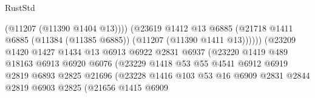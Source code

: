 \begin{lexlean}{RustStd}
\begin{coremodule}
                                              (@11207 (@11390 @1404 @13))))
                                          (@23619
                                            @1412
                                            @13
                                            @6885
                                            (@21718
                                              @1411
                                              @6885
                                              (@11384 (@11385 @6885))
                                              (@11207 (@11390 @1411 @13))))))
                                      (@23209
                                        @1420
                                        @1427
                                        @1434
                                        @13
                                        @6913
                                        @6922
                                        @2831
                                        @6937
                                        (@23220
                                          @1419
                                          @489
                                          @18163
                                          @6913
                                          @6920
                                          @6076
                                          (@23229
                                            @1418
                                            @53
                                            @55
                                            @4541
                                            @6912
                                            @6919
                                            @2819
                                            @6893
                                            @2825
                                            @21696
                                            (@23228
                                              @1416
                                              @103
                                              @53
                                              @16
                                              @6909
                                              @2831
                                              @2844
                                              @2819
                                              @6903
                                              @2825
                                              (@21656
                                                @1415
                                                @6909

\end{coremodule}
\end{lexlean}
